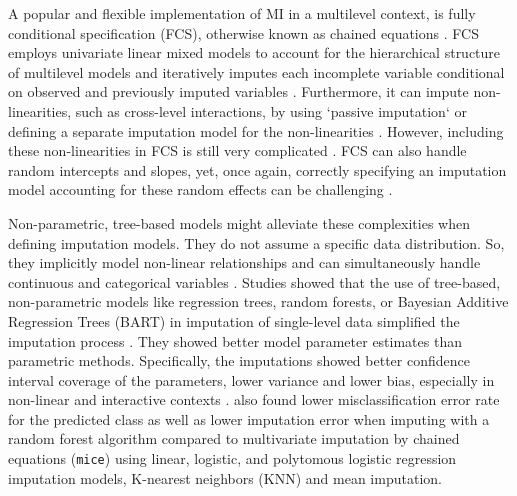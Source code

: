 \documentclass[10pt, a4paper, titlepage]{article}
\begin{document}
A popular and flexible implementation of MI in a multilevel context, is fully conditional specification (FCS), otherwise known as chained equations \citep{audigier2018, burgette2010, vanbuuren2007, grund2018a}. FCS employs univariate linear mixed models to account for the hierarchical structure of multilevel models \citep{mistlerComparisonJointModel2017, enders2018, resche-rigon2018} and iteratively imputes each incomplete variable conditional on observed and previously imputed variables \citep{mistlerComparisonJointModel2017, buurenFlexibleImputationMissing2018, enders2016, enders2018, enders2018a, hughes2014, grund2018a}. Furthermore, it can impute non-linearities, such as cross-level interactions, by using `passive imputation` or defining a separate imputation model for the non-linearities \citep{buurenFlexibleImputationMissing2018, grund2018}. However, including these non-linearities in FCS is still very complicated \citep{grund2021, grund2018,buurenFlexibleImputationMissing2018}. FCS can also handle random intercepts and slopes, yet, once again, correctly specifying an imputation model accounting for these random effects can be challenging \citep{grund2021, grund2018,buurenFlexibleImputationMissing2018}.


Non-parametric, tree-based models might alleviate these complexities when defining imputation models. They do not assume a specific data distribution. So, they implicitly model non-linear relationships and can simultaneously handle continuous and categorical variables \citep{hill2020, burgette2010, lin2019, chipman2010, james2021, salditt2023, breiman1984}. Studies showed that the use of tree-based, non-parametric models like regression trees, random forests, or Bayesian Additive Regression Trees (BART) in imputation of single-level data simplified the imputation process \citep{burgette2010,xu2016,silva2022,waljee2013}. They showed better model parameter estimates than parametric methods. Specifically, the imputations showed better confidence interval coverage of the parameters, lower variance and lower bias, especially in non-linear and interactive contexts \citep{burgette2010, xu2016, silva2022}. \citet{waljee2013} also found lower misclassification error rate for the predicted class as well as lower imputation error when imputing with a random forest algorithm compared to multivariate imputation by chained equations (\texttt{mice}) using linear, logistic, and polytomous logistic regression imputation models, K-nearest neighbors (KNN) and mean imputation.
\end{document}
